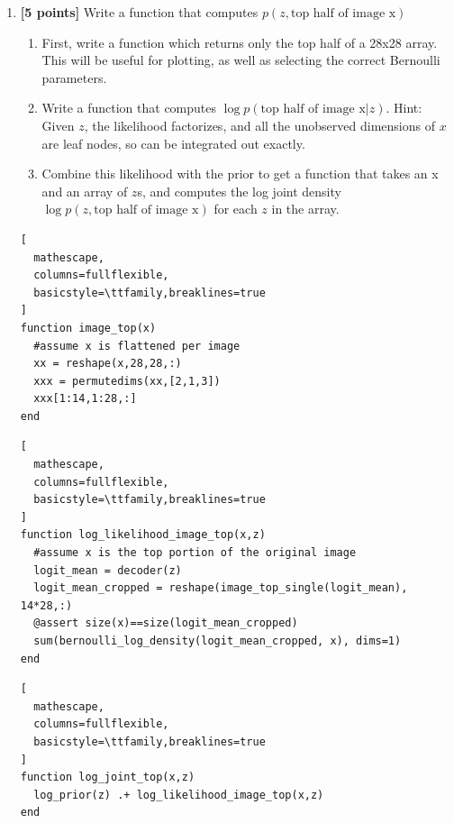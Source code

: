 \documentclass{article}
\begin{document}
\begin{enumerate}[label=(\alph*)]	
	\item {\bf [5 points]} Write a function that computes $p(z, \text{top half of image x})$
	
	\begin{enumerate}[label=(\alph*)]
		\item First, write a function which returns only the top half of a 28x28 array. This will be useful for plotting, as well as selecting the correct Bernoulli parameters.
    \item Write a function that computes $\log p(\text{top half of image x} | z)$. Hint: Given $z$, the likelihood factorizes, and all the unobserved dimensions of $x$ are leaf nodes, so can be integrated out exactly. 
		\item Combine this likelihood with the prior to get a function that takes an x and an array of $z$s, and computes the log joint density $\log p(z, \text{top half of image x})$ for each $z$ in the array.
	\end{enumerate}

        \begin{lstlisting}[
  mathescape,
  columns=fullflexible,
  basicstyle=\ttfamily,breaklines=true
]
function image_top(x)
  #assume x is flattened per image
  xx = reshape(x,28,28,:)
  xxx = permutedims(xx,[2,1,3])
  xxx[1:14,1:28,:]
end
\end{lstlisting}
\begin{lstlisting}[
  mathescape,
  columns=fullflexible,
  basicstyle=\ttfamily,breaklines=true
]
function log_likelihood_image_top(x,z)
  #assume x is the top portion of the original image
  logit_mean = decoder(z)
  logit_mean_cropped = reshape(image_top_single(logit_mean), 14*28,:)
  @assert size(x)==size(logit_mean_cropped)
  sum(bernoulli_log_density(logit_mean_cropped, x), dims=1)
end
\end{lstlisting}
\begin{lstlisting}[
  mathescape,
  columns=fullflexible,
  basicstyle=\ttfamily,breaklines=true
]
function log_joint_top(x,z)
  log_prior(z) .+ log_likelihood_image_top(x,z)
end
\end{lstlisting}

	

\end{enumerate}
\end{document}
